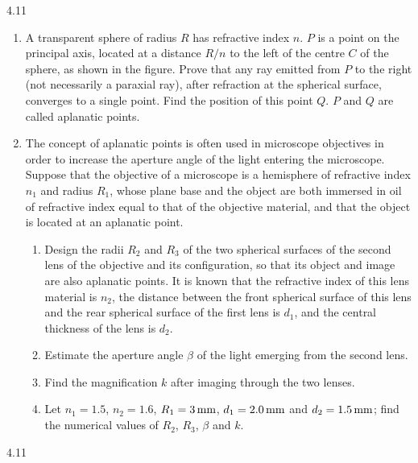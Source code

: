 \begin{problem}{4.11}
\begin{enumerate}[label=(\arabic*),leftmargin=2.2em,itemsep=2pt,topsep=2pt]
\item A transparent sphere of radius $R$ has refractive index $n$. $P$ is a point on the principal axis, located at a distance $R/n$ to the left of the centre $C$ of the sphere, as shown in the figure. Prove that any ray emitted from $P$ to the right (not necessarily a paraxial ray), after refraction at the spherical surface, converges to a single point. Find the position of this point $Q$. $P$ and $Q$ are called aplanatic points.
\item The concept of aplanatic points is often used in microscope objectives in order to increase the aperture angle of the light entering the microscope. Suppose that the objective of a microscope is a hemisphere of refractive index $n_1$ and radius $R_1$, whose plane base and the object are both immersed in oil of refractive index equal to that of the objective material, and that the object is located at an aplanatic point.
\begin{enumerate}[label=(\roman*),leftmargin=2.6em,itemsep=1pt,topsep=2pt]
\item Design the radii $R_2$ and $R_3$ of the two spherical surfaces of the second lens of the objective and its configuration, so that its object and image are also aplanatic points. It is known that the refractive index of this lens material is $n_2$, the distance between the front spherical surface of this lens and the rear spherical surface of the first lens is $d_1$, and the central thickness of the lens is $d_2$.
\item Estimate the aperture angle $\beta$ of the light emerging from the second lens.
\item Find the magnification $k$ after imaging through the two lenses.
\item Let $n_1 = 1.5$, $n_2 = 1.6$, $R_1 = 3\,\mathrm{mm}$, $d_1 = 2.0\,\mathrm{mm}$ and $d_2 = 1.5\,\mathrm{mm}$; find the numerical values of $R_2$, $R_3$, $\beta$ and $k$.
\end{enumerate}
\end{enumerate}
\end{problem}

\begin{figbox}{4.11}
\end{figbox}

